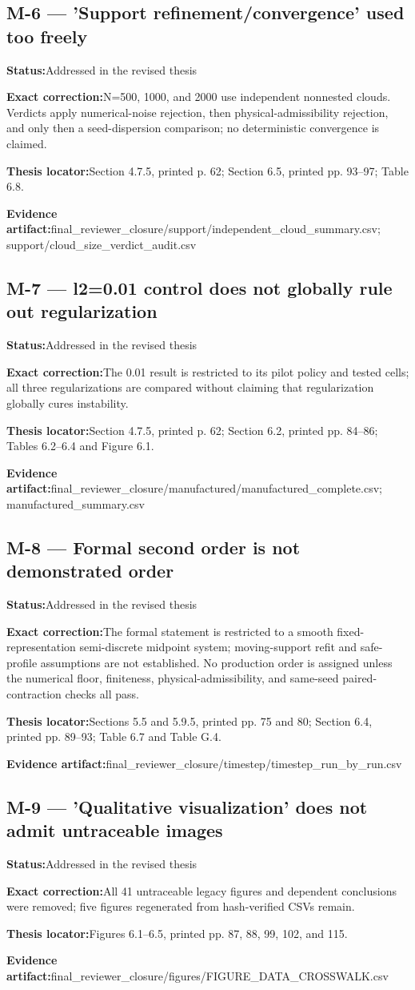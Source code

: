 \documentclass[11pt]{article}
\newcommand{\field}[2]{\textbf{#1}\quad #2\par}
\begin{document}
\subsection*{M-6 --- 'Support refinement/convergence' used too freely}
\field{Status:}{Addressed in the revised thesis}
\field{Exact correction:}{N=500, 1000, and 2000 use independent nonnested clouds. Verdicts apply numerical-noise rejection, then physical-admissibility rejection, and only then a seed-dispersion comparison; no deterministic convergence is claimed.}
\field{Thesis locator:}{Section 4.7.5, printed p. 62; Section 6.5, printed pp. 93--97; Table 6.8.}
\field{Evidence artifact:}{final\_reviewer\_closure/support/independent\_cloud\_summary.csv; support/cloud\_size\_verdict\_audit.csv}
\subsection*{M-7 --- l2=0.01 control does not globally rule out regularization}
\field{Status:}{Addressed in the revised thesis}
\field{Exact correction:}{The 0.01 result is restricted to its pilot policy and tested cells; all three regularizations are compared without claiming that regularization globally cures instability.}
\field{Thesis locator:}{Section 4.7.5, printed p. 62; Section 6.2, printed pp. 84--86; Tables 6.2--6.4 and Figure 6.1.}
\field{Evidence artifact:}{final\_reviewer\_closure/manufactured/manufactured\_complete.csv; manufactured\_summary.csv}
\subsection*{M-8 --- Formal second order is not demonstrated order}
\field{Status:}{Addressed in the revised thesis}
\field{Exact correction:}{The formal statement is restricted to a smooth fixed-representation semi-discrete midpoint system; moving-support refit and safe-profile assumptions are not established. No production order is assigned unless the numerical floor, finiteness, physical-admissibility, and same-seed paired-contraction checks all pass.}
\field{Thesis locator:}{Sections 5.5 and 5.9.5, printed pp. 75 and 80; Section 6.4, printed pp. 89--93; Table 6.7 and Table G.4.}
\field{Evidence artifact:}{final\_reviewer\_closure/timestep/timestep\_run\_by\_run.csv}
\subsection*{M-9 --- 'Qualitative visualization' does not admit untraceable images}
\field{Status:}{Addressed in the revised thesis}
\field{Exact correction:}{All 41 untraceable legacy figures and dependent conclusions were removed; five figures regenerated from hash-verified CSVs remain.}
\field{Thesis locator:}{Figures 6.1--6.5, printed pp. 87, 88, 99, 102, and 115.}
\field{Evidence artifact:}{final\_reviewer\_closure/figures/FIGURE\_DATA\_CROSSWALK.csv}
\end{document}
